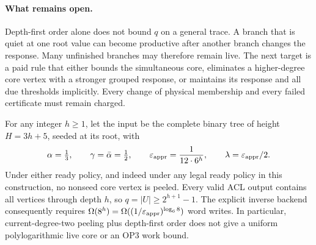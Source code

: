 \paragraph{What remains open.}
Depth-first order alone does not bound $q$ on a general trace. A branch that
is quiet at one root value can become productive after another branch
changes the response. Many unfinished branches may therefore remain live.
The next target is a paid rule that either bounds the simultaneous core,
eliminates a higher-degree core vertex with a stronger grouped response,
or maintains its response and all due thresholds implicitly. Every change
of physical membership and every failed certificate must remain charged.

\begin{proposition}
\label{prop:op3-live-core-interior-tree}
For any integer $h\geq1$, let the input be the complete binary tree of
height $H=3h+5$, seeded at its root, with
\[
 \alpha=\tfrac13,\qquad \gamma=\bar\alpha=\tfrac12,
 \qquad \varepsilon_{\mathrm{appr}}=\frac1{12\cdot6^h},\qquad
 \lambda=\varepsilon_{\mathrm{appr}}/2.
\]
Under either ready policy, and indeed under any legal ready policy in this
construction, no nonseed core vertex is peeled. Every valid ACL output
contains all vertices through depth $h$, so
$q=|U|\geq2^{h+1}-1$. The explicit inverse backend consequently requires
$\Omega(8^h)=\Omega((1/\varepsilon_{\mathrm{appr}})^{\log_6 8})$ word writes.
In particular, current-degree-two peeling plus depth-first order does not
give a uniform polylogarithmic live core or an OP3 work bound.
\end{proposition}
